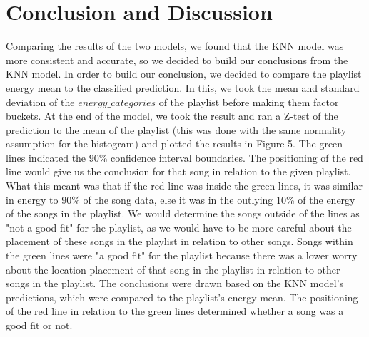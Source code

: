 \documentclass[titlepage]{article}
\begin{document}
\section{Conclusion and Discussion}
Comparing the results of the two models, we found that the KNN model was more consistent and accurate, so we decided to build our conclusions from the KNN model. In order to build our conclusion, we decided to compare the playlist energy mean to the classified prediction. In this, we took the mean and standard deviation of the $energy\_categories$ of the playlist before making them factor buckets. At the end of the model, we took the result and ran a Z-test of the prediction to the mean of the playlist (this was done with the same normality assumption for the histogram) and plotted the results in Figure 5. The green lines indicated the 90\% confidence interval boundaries. The positioning of the red line would give us the conclusion for that song in relation to the given playlist. What this meant was that if the red line was inside the green lines, it was similar in energy to 90\% of the song data, else it was in the outlying 10\% of the energy of the songs in the playlist. We would determine the songs outside of the lines as "not a good fit" for the playlist, as we would have to be more careful about the placement of these songs in the playlist in relation to other songs. Songs within the green lines were "a good fit" for the playlist because there was a lower worry about the location placement of that song in the playlist in relation to other songs in the playlist.                                                                                                                               The conclusions were drawn based on the KNN model's predictions, which were compared to the playlist's energy mean. The positioning of the red line in relation to the green lines determined whether a song was a good fit or not.
\end{document}
